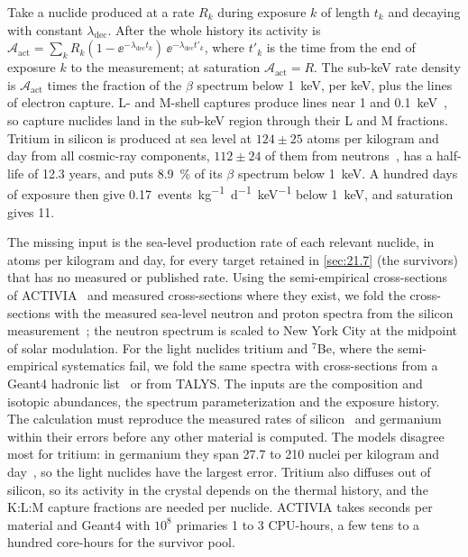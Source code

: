 Take a nuclide produced at a rate $R_k$ during exposure $k$ of length $t_k$ and decaying with constant $\lambda_{\mathrm{dec}}$. After the whole history its activity is $\mathcal{A}_{\mathrm{act}} = \sum_kR_k(1 - \ee^{-\lambda_{\mathrm{dec}}t_k})\,\ee^{-\lambda_{\mathrm{dec}}t'_k}$, where $t'_k$ is the time from the end of exposure $k$ to the measurement; at saturation $\mathcal{A}_{\mathrm{act}} = R$. The sub-keV rate density is $\mathcal{A}_{\mathrm{act}}$ times the fraction of the $\beta$ spectrum below \SI{1}{keV}, per keV, plus the lines of electron capture. L- and M-shell captures produce lines near 1 and \SI{0.1}{keV}~\cite[Sect.~1]{armengaud2017measurement}, so capture nuclides land in the sub-keV region through their L and M fractions. Tritium in silicon is produced at sea level at $124 \pm 25$ atoms per kilogram and day from all cosmic-ray components, $112 \pm 24$ of them from neutrons~\cite{saldanha2020cosmogenic}, has a half-life of 12.3 years, and puts \SI{8.9}{\percent} of its $\beta$ spectrum below \SI{1}{keV}. A hundred days of exposure then give \SI{0.17}{events.kg^{-1}.d^{-1}.keV^{-1}} below \SI{1}{keV}, and saturation gives 11.

The missing input is the sea-level production rate of each relevant nuclide, in atoms per kilogram and day, for every target retained in \cref{sec:21.7} (the survivors) that has no measured or published rate. Using the semi-empirical cross-sections of ACTIVIA~\cite{back2008activia} and measured cross-sections where they exist, we fold the cross-sections with the measured sea-level neutron and proton spectra from the silicon measurement~\cite{saldanha2020cosmogenic}; the neutron spectrum is scaled to New York City at the midpoint of solar modulation. For the light nuclides tritium and $^7$Be, where the semi-empirical systematics fail, we fold the same spectra with cross-sections from a Geant4 hadronic list~\cite{agostinelli2003geant4} or from TALYS. The inputs are the composition and isotopic abundances, the spectrum parameterization and the exposure history. The calculation must reproduce the measured rates of silicon~\cite{saldanha2020cosmogenic} and germanium~\cite{armengaud2017measurement} within their errors before any other material is computed. The models disagree most for tritium: in germanium they span 27.7 to 210 nuclei per kilogram and day~\cite[Sect.~6.3]{armengaud2017measurement}, so the light nuclides have the largest error. Tritium also diffuses out of silicon, so its activity in the crystal depends on the thermal history, and the K:L:M capture fractions are needed per nuclide. ACTIVIA takes seconds per material and Geant4 with $10^8$ primaries 1 to 3 CPU-hours, a few tens to a hundred core-hours for the survivor pool.

